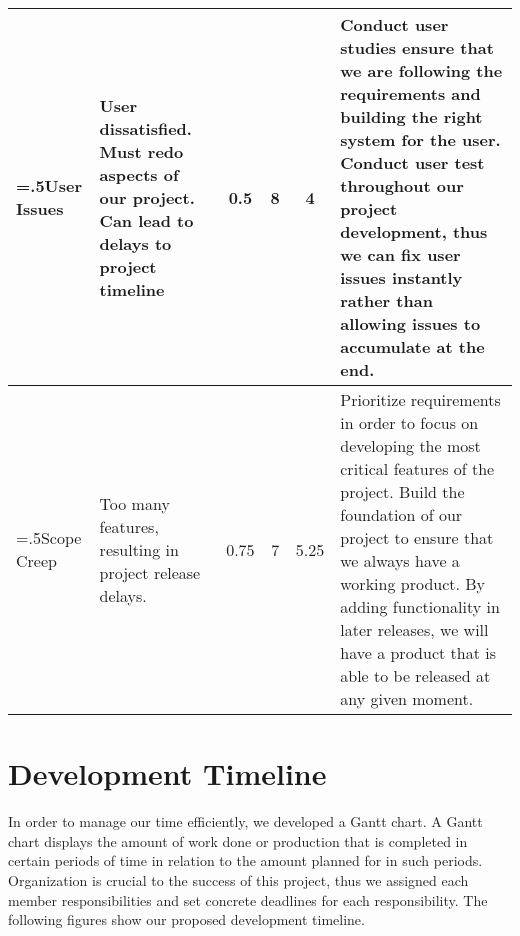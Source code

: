 \begin{table}[ht]
\begin{tabularx}{\textwidth}{|>{\hsize=.5\hsize}X|X|c|c|c|>{\hsize=1.5\hsize}X|}
    \hline
    User Issues & User dissatisfied. Must redo aspects of our project. Can lead to delays to project timeline & 0.5 & 8 & 4 & Conduct user studies ensure that we are following the requirements and building the right system for the user. Conduct user test throughout our project development, thus we can fix user issues instantly rather than allowing issues to accumulate at the end. \\ 
    \hline
    Scope Creep & Too many features, resulting in project release delays. & 0.75 & 7 & 5.25 & Prioritize requirements in order to focus on developing the most critical features of the project. Build the foundation of our project to ensure that we always have a working product. By adding functionality in later releases, we will have a product that is able to be released at any given moment. \\
    \hline
\end{tabularx}
\end{table}
\FloatBarrier
\section{Development Timeline}
In order to manage our time efficiently, we developed a Gantt chart. A Gantt chart displays the amount of work done or production that is completed in certain periods of time in relation to the amount planned for in such periods. Organization is crucial to the success of this project, thus we assigned each member responsibilities and set concrete deadlines for each responsibility. The following figures show our proposed development timeline.

\begin{figure}[h]
\centering
    \begin{gantt}{4}{2}
        \begin{ganttitle}
        \end{ganttitle}
    \end{gantt}
\end{figure}

